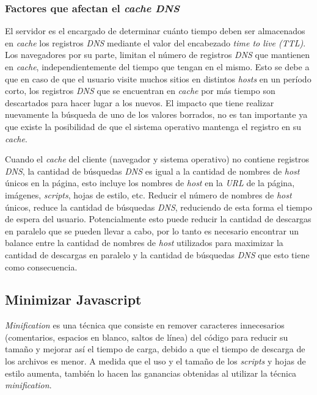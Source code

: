 \subsubsection{Factores que afectan el \emph{cache DNS}}

El servidor es el encargado de determinar cuánto tiempo deben ser almacenados en \emph{cache} los registros \emph{DNS} mediante el valor del encabezado \emph{time to live (TTL)}.
Los navegadores por su parte, limitan el número de registros \emph{DNS} que
mantienen en \emph{cache}, independientemente del tiempo que tengan en el mismo.
Esto se debe a que en caso de que el usuario visite muchos sitios en distintos \emph{hosts} en un período corto, los registros \emph{DNS} que se encuentran en \emph{cache}
por más tiempo son descartados para hacer lugar a los nuevos. El impacto que tiene realizar nuevamente la búsqueda de uno de los valores borrados, no es tan importante
ya que existe la posibilidad de que el sistema operativo mantenga el registro en su \emph{cache}.

Cuando el \emph{cache} del cliente (navegador y sistema operativo) no contiene registros \emph{DNS}, la cantidad de búsquedas \emph{DNS} es igual a la cantidad de nombres de \emph{host}
únicos en la página, esto incluye los nombres de \emph{host} en la \emph{URL} de la página, imágenes, \emph{scripts}, hojas de estilo, etc. Reducir el número de nombres de \emph{host}
únicos, reduce la cantidad de búsquedas \emph{DNS}, reduciendo de esta forma el tiempo de espera del usuario.
Potencialmente esto puede reducir la cantidad de descargas en paralelo que se pueden llevar a cabo, por
lo tanto es necesario encontrar un balance entre la cantidad de nombres de \emph{host} utilizados para
maximizar la cantidad de descargas en paralelo y la cantidad de búsquedas \emph{DNS} que esto tiene
como consecuencia.


\subsection{Minimizar Javascript}

\emph{Minification} es una técnica que consiste en remover caracteres innecesarios (comentarios,
espacios en blanco, saltos de línea) del código para reducir su tamaño y mejorar así el tiempo de carga,
debido a que el tiempo de descarga de los archivos es menor. A medida que el uso y el tamaño de los
\emph{scripts} y hojas de estilo aumenta, también lo hacen las ganancias obtenidas al utilizar la técnica \emph{minification}.

